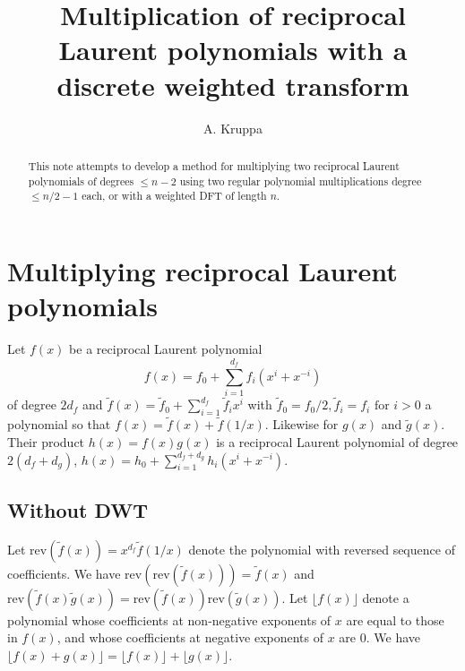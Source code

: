 \documentclass{article}
\begin{document}
\newcommand{\Z}{\mathbb{Z}}
\newcommand{\Zn}[1]{(\Z/{#1}\Z)^{*}}
\newcommand{\tf}{\tilde{f}}
\newcommand{\tg}{\tilde{g}}
\newcommand{\rev}{\textrm{rev}}

\title{Multiplication of reciprocal Laurent polynomials with a discrete 
       weighted transform}
\author{A. Kruppa}
\maketitle

\begin{abstract}
This note attempts to develop a method for multiplying two reciprocal
Laurent polynomials of degrees $\leq n - 2$ using two regular polynomial
multiplications degree $\leq n/2 - 1$ each, or with a weighted DFT of 
length $n$.
\end{abstract}

\section{Multiplying reciprocal Laurent polynomials}

Let $f(x)$ be a reciprocal Laurent polynomial
\begin{displaymath}
f(x) = f_0 + \sum_{i=1}^{d_f} f_i (x^i + x^{-i})
\end{displaymath}
of degree $2d_f$ and $\tf(x) = \tf_0 + \sum_{i=1}^{d_f} \tf_i x^i$ with
$\tf_0 = f_0 / 2, \tf_i = f_i \textrm{ for } i>0$ a polynomial so that
$f(x) = \tf(x) + \tf(1/x)$. Likewise for $g(x)$ and $\tg(x)$.
Their product $h(x) = f(x)g(x)$ is a reciprocal Laurent polynomial of degree
$2(d_f + d_g)$, $h(x) = h_0 + \sum_{i=1}^{d_f + d_g} h_i (x^i + x^{-i})$.

\subsection{Without DWT}

Let $\rev(\tf(x)) = x^{d_f} \tf(1/x)$ denote the polynomial with 
reversed sequence of coefficients. We have $\rev(\rev(\tf(x))) = \tf(x)$ and
$\rev(\tf(x) \tg(x)) = \rev(\tf(x)) \rev(\tg(x))$.
Let $\lfloor f(x) \rfloor$ denote a 
polynomial whose coefficients at non-negative exponents of $x$ are equal to 
those in $f(x)$, and whose coefficients at negative exponents of $x$ are 
$0$. We have 
$\lfloor f(x) + g(x) \rfloor = \lfloor f(x) \rfloor + \lfloor g(x) \rfloor$.
\end{document}
